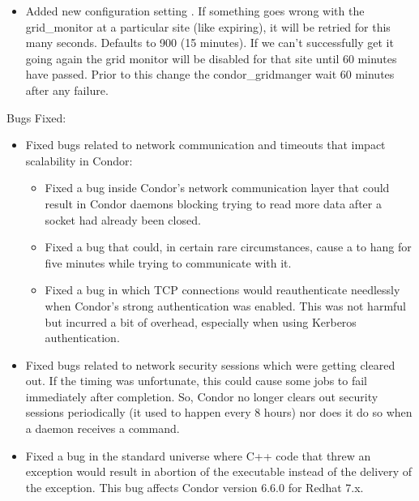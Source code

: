 \begin{itemize}
\item Added new configuration setting
  .  
  If something goes wrong
  with the grid\_monitor at a particular site (like
   expiring), it will be retried
  for this many seconds.  Defaults to 900 (15 minutes).  If we
  can't successfully get it going again the grid monitor will be
  disabled for that site until 60 minutes have passed.  Prior to
  this change the condor\_gridmanger wait 60 minutes after any
  failure.

\end{itemize}



\noindent Bugs Fixed:

\begin{itemize}

\item Fixed bugs related to network communication and timeouts that
  impact scalability in Condor:
  \begin{itemize}
    \item Fixed a bug inside Condor's network communication layer that 
      could result in Condor daemons blocking trying to read more data
      after a socket had already been closed.
    \item Fixed a  bug that could, in certain rare
      circumstances, cause a  to hang for five minutes
      while trying to communicate with it.
    \item Fixed a bug in which TCP connections would reauthenticate
      needlessly when Condor's strong authentication was enabled.
      This was not harmful but incurred a bit of overhead, especially
      when using Kerberos authentication.
  \end{itemize}

\item Fixed bugs related to network security sessions which were
  getting cleared out.
  If the timing was unfortunate, this could cause some jobs to fail
  immediately after completion.
  So, Condor no longer clears out security sessions periodically (it
  used to happen every 8 hours) nor does it do so when a daemon
  receives a  command.

\item Fixed a bug in the standard universe where C++ code that threw an 
exception would result in abortion of the executable instead of the
delivery of the exception. This bug affects Condor version 6.6.0 for
Redhat 7.x.


\end{itemize}
